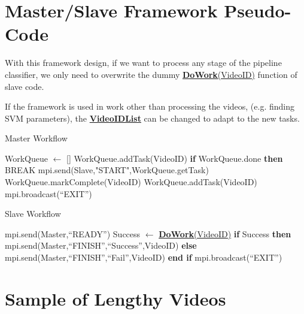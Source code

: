 \documentclass[bsc,logo,twoside,fullspacing,parskip]{infthesis}
\begin{document}
\begin{appendices}

\chapter{Master/Slave Framework Pseudo-Code}
\label{apped:msf}

With this framework design, if we want to process any stage of the pipeline classifier, we only need to overwrite the dummy \underline{\textbf{DoWork}(VideoID)} function of slave code.

If the framework is used in work other than processing the videos, (e.g. finding SVM parameters), the  \underline{\textbf{VideoIDList}} can be changed to adapt to the new tasks.

\begin{algorithm}
\caption{Master Workflow}
\begin{algorithmic}
\STATE WorkQueue $\leftarrow$ []
	\STATE WorkQueue.addTask(VideoID)
\ENDFOR
{}
		\STATE \textbf{if} WorkQueue.done \textbf{then} BREAK 
		\STATE mpi.send(Slave,"START",WorkQueue.getTask)
	\ENDFOR
		\STATE WorkQueue.markComplete(VideoID)
			\STATE WorkQueue.addTask(VideoID)
		\ENDIF
	\ENDFOR
\ENDWHILE
\STATE mpi.broadcast(``EXIT'')
\end{algorithmic} 
\end{algorithm}

\begin{algorithm}
\caption{Slave Workflow}
\begin{algorithmic}
	\STATE mpi.send(Master,``READY'')
		\STATE Success $\leftarrow$ \underline{\textbf{DoWork}(VideoID)}
		\STATE \textbf{if} Success \textbf{then}
		\STATE \hspace{10pt}mpi.send(Master,``FINISH'',``Success'',VideoID)
		\STATE \textbf{else}
		\STATE \hspace{10pt}mpi.send(Master,``FINISH'',``Fail'',VideoID)
		\STATE \textbf{end if}
	\ENDIF
\ENDWHILE
\STATE mpi.broadcast(``EXIT'')
\end{algorithmic} 
\end{algorithm}

\chapter{Sample of Lengthy Videos}
\label{append:samplelong}


\end{appendices}
\end{document}
